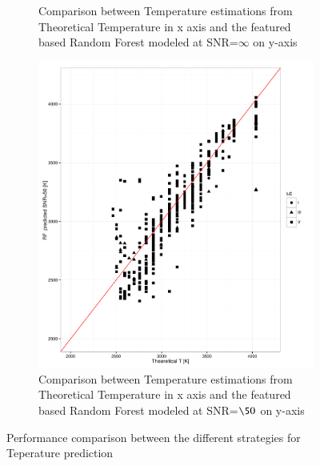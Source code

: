 \begin {figure}
\begin{subfigure}{.85\textwidth}
  \caption{Comparison between Temperature estimations from Theoretical Temperature 
  in x axis and the featured based Random Forest modeled at SNR=$\infty$ on y-axis}
 \label{fig:ipac_rfoo_lsb}
 \end{subfigure}
  \begin{subfigure}{.85\textwidth}
  \centering
  \includegraphics[width=11cm]{figs/ipac_T_RF50_LSB.pdf}
  \caption{Comparison between Temperature estimations from Theoretical Temperature 
  in x axis and the featured based Random Forest modeled at SNR=$\50$ on y-axis}
 \label{fig:ipac_rf50_lsb}
 \end{subfigure}
 \label {fig:comp01}
 \caption{Performance comparison between the different strategies for Teperature prediction}
\end {figure}
 
